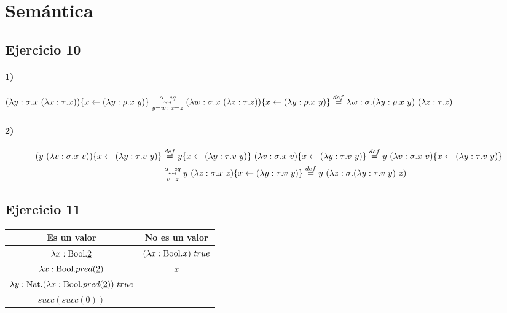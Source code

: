 \documentclass[10pt,a4paper, landscape]{article}
\begin{document}
\section*{\centering Semántica}
\subsection{Ejercicio 10}
\paragraph{1)} $(\lambda y: \sigma \text{.} x~(\lambda x: \tau \text{.} x))\{x\leftarrow(\lambda y: \rho \text{.} x~y)\}\underset{y=w;~x=z}{\overset{\alpha-eq}{\leadsto}}(\lambda w: \sigma \text{.} x~(\lambda z: \tau \text{.} z))\{x\leftarrow(\lambda y: \rho \text{.} x~y)\} \overset{def}{=} \lambda w: \sigma \text{.} (\lambda y: \rho \text{.} x~y)~(\lambda z: \tau \text{.} z)$

\paragraph{2)}
\begin{equation*}
\begin{split}
(y~(\lambda v: \sigma \text{.} x~v))\{x\leftarrow(\lambda y: \tau \text{.} v~y)\} &\overset{def}{=}
y\{x\leftarrow(\lambda y: \tau \text{.} v~y)\}~(\lambda v: \sigma \text{.} x~v)\{x\leftarrow(\lambda y: \tau \text{.} v~y)\} \overset{def}{=}
y~(\lambda v: \sigma \text{.} x~v)\{x\leftarrow(\lambda y: \tau \text{.} v~y)\} \\
&\underset{v=z}{\overset{\alpha-eq}{\leadsto}}
y~(\lambda z: \sigma \text{.} x~z)\{x\leftarrow(\lambda y: \tau \text{.} v~y)\} \overset{def}{=} y~(\lambda z: \sigma \text{.} (\lambda y: \tau \text{.} v~y)~z)
\end{split}
\end{equation*}

\subsection{Ejercicio 11}
\begin{center}
\begin{tabular}{c|c}
\textbf{Es un valor} & \textbf{No es un valor} \\
\hline
$\lambda x: \text{Bool} \text{.} \underline{2}$ & $(\lambda x: \text{Bool} \text{.} x)~true$ \\
$\lambda x: \text{Bool} \text{.} pred(\underline{2})$ &  $x$ \\
$\lambda y: \text{Nat} \text{.} (\lambda x: \text{Bool} \text{.} pred(\underline{2}))~true$ &  \\
$succ(succ(0))$ &  \\
\end{tabular}
\end{center}
\end{document}
